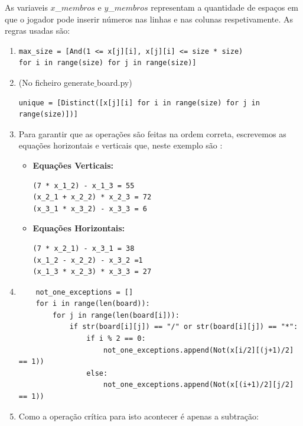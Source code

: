 \documentclass{article}
\begin{document}
As variaveis $x$\_$membros$ e $y$\_$membros$ representam a quantidade de espaços em que o jogador pode inserir números nas linhas e nas colunas respetivamente. As regras usadas são:

 \begin{enumerate}
 \item 
\begin{verbatim}
max_size = [And(1 <= x[j][i], x[j][i] <= size * size) 
for i in range(size) for j in range(size)]
\end{verbatim}

 \item \small{(No ficheiro generate$\_$board.py)}

\begin{verbatim}
unique = [Distinct([x[j][i] for i in range(size) for j in range(size)])]
\end{verbatim}

 \item Para garantir que as operações são feitas na ordem correta, escrevemos as equações horizontais e verticais que, neste exemplo são : \\
\begin{itemize}
\item {\bf{Equações Verticais:}}
\begin{verbatim}
(7 * x_1_2) - x_1_3 = 55
(x_2_1 + x_2_2) * x_2_3 = 72
(x_3_1 * x_3_2) - x_3_3 = 6
\end{verbatim}
\item {\bf{Equações Horizontais:}}
\begin{verbatim}
(7 * x_2_1) - x_3_1 = 38
(x_1_2 - x_2_2) - x_3_2 =1
(x_1_3 * x_2_3) * x_3_3 = 27
\end{verbatim}
\end{itemize}

\item 
\small{
\begin{verbatim}
    not_one_exceptions = []
    for i in range(len(board)):
        for j in range(len(board[i])):
            if str(board[i][j]) == "/" or str(board[i][j]) == "*":
                if i % 2 == 0:
                    not_one_exceptions.append(Not(x[i/2][(j+1)/2] == 1))
                else:
                    not_one_exceptions.append(Not(x[(i+1)/2][j/2] == 1))
\end{verbatim}
}
\newpage

\item Como a operação crítica para isto acontecer é apenas a subtração: 


\end{enumerate}
\end{document}
